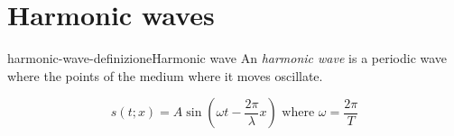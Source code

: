 \documentclass[preview]{standalone}
\begin{document}
\section{Harmonic waves}

\begin{snippetdefinition}{harmonic-wave-definizione}{Harmonic wave}
    An \textit{harmonic wave} is a periodic wave where
    the points of the medium where it moves oscillate.

    \[
        s(t;x) = A \sin
        \left(
            \omega t - \frac{2\pi}{\lambda}x
        \right)
        \text{ where } \omega = \frac{2\pi}{T}
    \]
\end{snippetdefinition}
\end{document}
